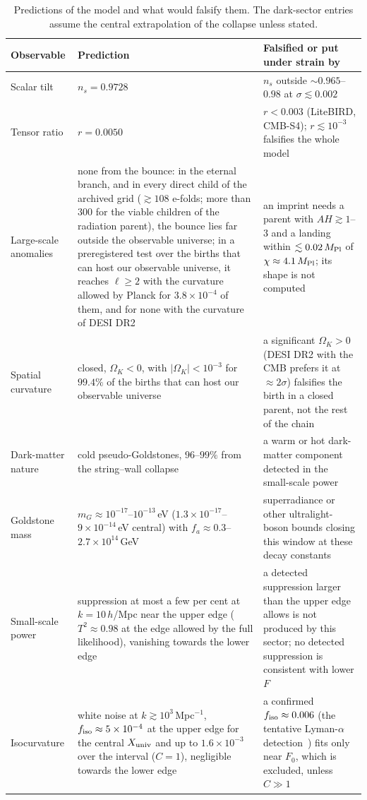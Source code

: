 \documentclass[11pt,a4paper]{article}
\newcommand{\Mpl}{M_{\rm Pl}}
\newcommand{\Xu}{X_{\rm univ}}
\begin{document}
\begin{table}[t]
\centering\small
\caption{Predictions of the model and what would falsify them. The dark-sector entries assume the central extrapolation of the collapse unless stated.}
\label{tab:predictions}
\begin{tabular}{L{3.0cm}L{5.4cm}L{5.6cm}}
\toprule
Observable & Prediction & Falsified or put under strain by\\
\midrule
Scalar tilt & $n_s = 0.9728$ & $n_s$ outside $\sim0.965$--$0.98$ at $\sigma\lesssim0.002$\\
Tensor ratio & $r = 0.0050$ & $r<0.003$ (LiteBIRD, CMB-S4); $r\lesssim10^{-3}$ falsifies the whole model\\
Large-scale anomalies & none from the bounce: in the eternal branch, and in every direct child of the archived grid ($\gtrsim108$ e-folds; more than $300$ for the viable children of the radiation parent), the bounce lies far outside the observable universe; in a preregistered test over the births that can host our observable universe, it reaches $\ell\ge2$ with the curvature allowed by Planck for $3.8\times10^{-4}$ of them, and for none with the curvature of DESI DR2 & an imprint needs a parent with $AH\gtrsim1$--$3$ and a landing within $\lesssim0.02\,\Mpl$ of $\chi\approx4.1\,\Mpl$; its shape is not computed\\
Spatial curvature & closed, $\Omega_K<0$, with $|\Omega_K|<10^{-3}$ for $99.4\%$ of the births that can host our observable universe & a significant $\Omega_K>0$ (DESI DR2 with the CMB prefers it at $\approx2\sigma$) falsifies the birth in a closed parent, not the rest of the chain\\
Dark-matter nature & cold pseudo-Goldstones, $96$--$99\%$ from the string--wall collapse & a warm or hot dark-matter component detected in the small-scale power\\
Goldstone mass & $m_G\approx10^{-17}$--$10^{-13}$\,eV ($1.3\times10^{-17}$--$9\times10^{-14}$\,eV central) with $f_a\approx0.3$--$2.7\times10^{14}$\,GeV & superradiance or other ultralight-boson bounds closing this window at these decay constants\\
Small-scale power & suppression at most a few per cent at $k=10\,h$/Mpc near the upper edge ($T^2\approx0.98$ at the edge allowed by the full likelihood), vanishing towards the lower edge & a detected suppression larger than the upper edge allows is not produced by this sector; no detected suppression is consistent with lower $F$\\
Isocurvature & white noise at $k\gtrsim10^3$\,Mpc$^{-1}$, $f_{\rm iso}\approx5\times10^{-4}$ at the upper edge for the central $\Xu$ and up to $1.6\times10^{-3}$ over the interval ($C=1$), negligible towards the lower edge & a confirmed $f_{\rm iso}\approx0.006$ (the tentative Lyman-$\alpha$ detection~\cite{GarciaGallego2026}) fits only near $F_0$, which is excluded, unless $C\gg1$\\

\end{tabular}
\end{table}
\end{document}
